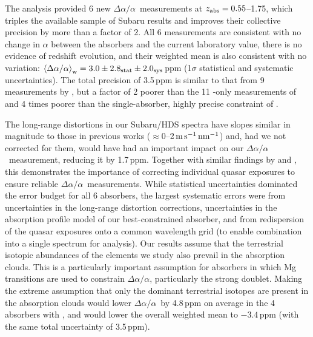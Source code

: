 \documentclass[fleqn,usenatbib,usedcolumn]{mnras}
\newcommand{\ms}{\ensuremath{\textrm{m\,s}^{-1}}}
\newcommand{\zab}{\ensuremath{z_\textrm{\scriptsize abs}}}
\newcommand{\daa}{\ensuremath{\Delta\alpha/\alpha}}
\newcommand{\msnm}{\ensuremath{\ms\,\textrm{nm}^{-1}}}
\begin{document}
The analysis provided 6 new \daa\ measurements at $\zab=0.55$--1.75, which triples the available sample of Subaru results and improves their collective precision by more than a factor of 2. All 6 measurements are consistent with no change in $\alpha$ between the absorbers and the current laboratory value, there is no evidence of redshift evolution, and their weighted mean is also consistent with no variation: $\left<\daa\right>_{\rm w}=3.0\pm2.8_{\rm stat}\pm2.0_{\rm sys}$\,ppm (1$\sigma$ statistical and systematic uncertainties). The total precision of 3.5\,ppm is similar to that from 9 measurements by \citet[][3.6\,ppm]{Evans:2014:128}, but a factor of 2 poorer than the 11 -only measurements of \citet[][1.7\,ppm]{Murphy:2016:2461} and 4 times poorer than the single-absorber, highly precise constraint of \citet[][0.9\,ppm]{Kotus:2017:3679}.

The long-range distortions in our Subaru/HDS spectra have slopes similar in magnitude to those in previous works ($\approx 0$--2\,\msnm) and, had we not corrected for them, would have had an important impact on our \daa\ measurement, reducing it by 1.7\,ppm. Together with similar findings by \citet{Evans:2014:128} and \citet{Kotus:2017:3679}, this demonstrates the importance of correcting individual quasar exposures to ensure reliable \daa\ measurements. While statistical uncertainties dominated the error budget for all 6 absorbers, the largest systematic errors were from uncertainties in the long-range distortion corrections, uncertainties in the absorption profile model of our best-constrained absorber, and from redispersion of the quasar exposures onto a common wavelength grid (to enable combination into a single spectrum for analysis). Our results assume that the terrestrial isotopic abundances of the elements we study also prevail in the absorption clouds. This is a particularly important assumption for absorbers in which Mg transitions are used to constrain \daa, particularly the strong  doublet. Making the extreme assumption that only the dominant terrestrial isotopes are present in the absorption clouds would lower \daa\ by 4.8\,ppm on average in the 4 absorbers with , and would lower the overall weighted mean to $-3.4$\,ppm (with the same total uncertainty of 3.5\,ppm).
\end{document}
